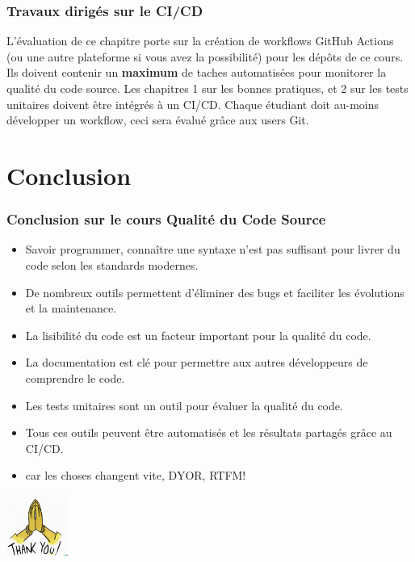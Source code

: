 \documentclass{beamer}
\begin{document}
    \begin{frame}
        \frametitle{Travaux dirigés sur le CI/CD}
        \transdissolve
        L'évaluation de ce chapitre porte sur la création de workflows GitHub Actions (ou une autre plateforme si vous avez la possibilité) pour les dépôts de ce cours.
        \bigbreak
        Ils doivent contenir un \textbf{maximum} de taches automatisées pour monitorer la qualité du code source.
        \bigbreak
        Les chapitres 1 sur les bonnes pratiques, et 2 sur les tests unitaires doivent être intégrés à un CI/CD.
        \bigbreak
        Chaque étudiant doit au-moins développer un workflow, ceci sera évalué grâce aux users Git.
    \end{frame}


    \section{Conclusion}
    \begin{frame}
        \frametitle{Conclusion sur le cours Qualité du Code Source}
        \transdissolve
        \begin{itemize}
            \item Savoir programmer, connaître une syntaxe n'est pas suffisant pour livrer du code selon les standards modernes.
            \item De nombreux outils permettent d'éliminer des bugs et faciliter les évolutions et la maintenance.
            \item La lisibilité du code est un facteur important pour la qualité du code.
            \item La documentation est clé pour permettre aux autres développeurs de comprendre le code.
            \item Les tests unitaires sont un outil pour évaluer la qualité du code.
            \item Tous ces outils peuvent être automatisés et les résultats partagés grâce au CI/CD.
            \item {} car les choses changent vite, DYOR, RTFM!
        \end{itemize}
        \centering
        \includegraphics[width=2cm]{image/prayer-hands-thank-you.png}
    \end{frame}
\end{document}
